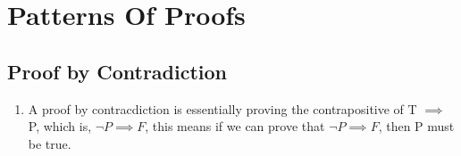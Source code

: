 \documentclass{article}
\begin{document}
	\section{Patterns Of Proofs}
	\subsection{Proof by Contradiction}
\begin{enumerate}

\item A proof by contracdiction is essentially proving the contrapositive of T $\implies$ P, which is, $\neg P \implies F$, this means if we can prove that $\neg P \implies F$, then P must be true.
\end{enumerate}
\end{document}
